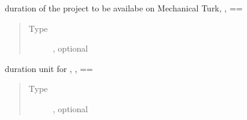 \documentclass[a4paper,12pt,english]{sphinxmanual}
\begin{document}
\begin{fulllineitems}
\begin{fulllineitems}
\label{\detokenize{project_rst/user_rst/forms:project.user.forms.ProjectInformationForm.lifetime}}
duration of the project
to be availabe on Mechanical Turk,  ,
 {\hyperref[\detokenize{project_rst/user_rst/forms:project.user.forms.ProjectInformationForm.mturk}]{}} == 
\begin{quote}\begin{description}
\item[{Type}] \leavevmode
{}, optional

\end{description}\end{quote}

\end{fulllineitems}


\begin{fulllineitems}
\label{\detokenize{project_rst/user_rst/forms:project.user.forms.ProjectInformationForm.lifetimeunit}}
duration unit for {\hyperref[\detokenize{project_rst/user_rst/forms:project.user.forms.ProjectInformationForm.lifetime}]{}},
 ,
 {\hyperref[\detokenize{project_rst/user_rst/forms:project.user.forms.ProjectInformationForm.mturk}]{}} == 
\begin{quote}\begin{description}
\item[{Type}] \leavevmode
{}, optional

\end{description}\end{quote}

\end{fulllineitems}


\end{fulllineitems}
\end{document}
